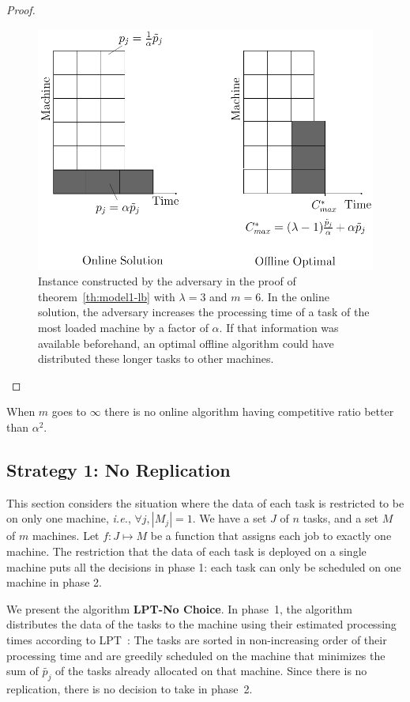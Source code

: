 \documentclass[twocolumn]{svjour3}
\begin{document}
\begin{proof}
  \begin{figure}[htp]
  \centering
  \includegraphics[width= 8 cm]{model1.pdf}
  \caption{Instance constructed by the adversary in the proof of
    theorem~\ref{th:model1-lb} with $\lambda = 3$ and $m = 6$. In the
    online solution, the adversary increases 
    the processing time of a task of the most loaded machine by a factor of $\alpha$. If
    that information was available beforehand, an optimal offline
    algorithm could have distributed these longer tasks to other
    machines.}
  \label{fig:rara}
  \end{figure}
\end{proof}    
  
  
  \begin{corollary}
  When $m$ goes to $\infty$ there is no online algorithm having competitive ratio better than $\alpha^{2}$.
  \end{corollary}


\subsection{Strategy 1: No Replication}\label{sec4}
\label{sec:rbm-norep}

This section considers the situation where the data of each task is
restricted to be on only one machine, {\em i.e.}, $\forall j, |M_j|=1$.  We
have a set $J$ of $n$ tasks, and a set $M$ of $m$ machines.  Let $f :
J \mapsto M$ be a function that assigns each job to exactly one
machine. The restriction that the data of each task is deployed on a
single machine puts all the decisions in phase 1: each task can only be
scheduled on one machine in phase 2.


We present the algorithm \textbf{LPT-No Choice}. In phase~1, the
algorithm distributes the data of the tasks to the machine using
their estimated processing times according to 
LPT~\cite{Graham69boundson}: The tasks are sorted in non-increasing
order of their processing time and are greedily scheduled on the
machine that minimizes the sum of $\tilde{p_j}$ of the tasks
already allocated on that machine. Since there is no replication, there is
no decision to take in phase~2.
\end{document}

